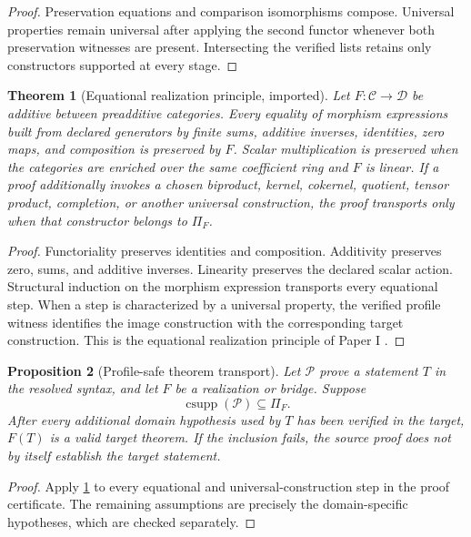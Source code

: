 \documentclass[11pt]{article}
\newtheorem{theorem}{Theorem}[section]
\newtheorem{proposition}[theorem]{Proposition}
\theoremstyle{definition}
\theoremstyle{remark}
\begin{document}
\begin{proof}
Preservation equations and comparison isomorphisms compose.  Universal properties remain universal after applying the second functor whenever both preservation witnesses are present.  Intersecting the verified lists retains only constructors supported at every stage.
\end{proof}

\begin{theorem}[Equational realization principle, imported]
\label{thm:equational-realization-expanded}
Let \(F:\mathcal C\to\mathcal D\) be additive between preadditive categories.  Every equality of morphism expressions built from declared generators by finite sums, additive inverses, identities, zero maps, and composition is preserved by \(F\).  Scalar multiplication is preserved when the categories are enriched over the same coefficient ring and \(F\) is linear.  If a proof additionally invokes a chosen biproduct, kernel, cokernel, quotient, tensor product, completion, or another universal construction, the proof transports only when that constructor belongs to \(\Pi_F\).
\end{theorem}

\begin{proof}
Functoriality preserves identities and composition.  Additivity preserves zero, sums, and additive inverses.  Linearity preserves the declared scalar action.  Structural induction on the morphism expression transports every equational step.  When a step is characterized by a universal property, the verified profile witness identifies the image construction with the corresponding target construction.  This is the equational realization principle of Paper I \cite{P1}.
\end{proof}

\begin{proposition}[Profile-safe theorem transport]
\label{prop:profile-safe-theorem-transport}
Let \(\mathcal P\) prove a statement \(T\) in the resolved syntax, and let \(F\) be a realization or bridge.  Suppose
\[
\operatorname{csupp}(\mathcal P)\subseteq\Pi_F.
\]
After every additional domain hypothesis used by \(T\) has been verified in the target, \(F(T)\) is a valid target theorem.  If the inclusion fails, the source proof does not by itself establish the target statement.
\end{proposition}

\begin{proof}
Apply \cref{thm:equational-realization-expanded} to every equational and universal-construction step in the proof certificate.  The remaining assumptions are precisely the domain-specific hypotheses, which are checked separately.
\end{proof}
\end{document}
